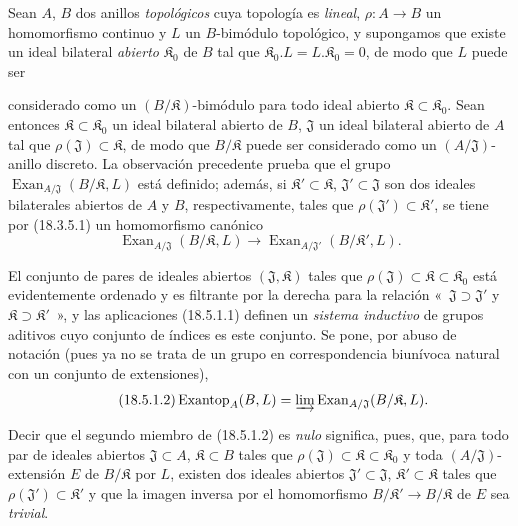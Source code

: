 \begin{env}[18.5.1]
\label{0.18.5.1-es}
Sean $A$, $B$ dos anillos \emph{topológicos} cuya topología es \emph{lineal},
$\rho:A\to B$ un homomorfismo continuo y $L$ un $B$-bimódulo topológico, y
supongamos que existe un ideal bilateral \emph{abierto} $\mathfrak K_0$ de $B$
tal que $\mathfrak K_0.L=L.\mathfrak K_0=0$, de modo que $L$ puede ser


considerado como un $(B/\mathfrak K)$-bimódulo para todo ideal abierto
$\mathfrak K\subset\mathfrak K_0$. Sean entonces
$\mathfrak K\subset\mathfrak K_0$ un ideal bilateral abierto de $B$,
$\mathfrak J$ un ideal bilateral abierto de $A$ tal que
$\rho(\mathfrak J)\subset\mathfrak K$, de modo que $B/\mathfrak K$ puede ser
considerado como un $(A/\mathfrak J)$-anillo discreto. La observación
precedente prueba que el grupo
$\operatorname{Exan}_{A/\mathfrak J}(B/\mathfrak K,L)$ está definido; además,
si $\mathfrak K'\subset\mathfrak K$, $\mathfrak J'\subset\mathfrak J$ son dos
ideales bilaterales abiertos de $A$ y $B$, respectivamente, tales que
$\rho(\mathfrak J')\subset\mathfrak K'$, se tiene por (18.3.5.1) un
homomorfismo canónico
\begin{equation}
\label{0.18.5.1.1-es}
\tag{18.5.1.1}
  \operatorname{Exan}_{A/\mathfrak J}(B/\mathfrak K,L)
  \longrightarrow
  \operatorname{Exan}_{A/\mathfrak J'}(B/\mathfrak K',L).
\end{equation}

El conjunto de pares de ideales abiertos $(\mathfrak J,\mathfrak K)$ tales que
$\rho(\mathfrak J)\subset\mathfrak K\subset\mathfrak K_0$ está evidentemente
ordenado y es filtrante por la derecha para la relación «~$\mathfrak J\supset\mathfrak J'$
y $\mathfrak K\supset\mathfrak K'$~», y las aplicaciones (18.5.1.1)
definen un \emph{sistema inductivo} de grupos aditivos cuyo conjunto
de índices es este conjunto. Se pone, por abuso de notación (pues ya no se trata
de un grupo en correspondencia biunívoca natural con un conjunto
de extensiones),
\begin{equation}
\label{0.18.5.1.2-es}
\tag{18.5.1.2}
  \operatorname{Exantop}_A(B,L)
  =\varinjlim\operatorname{Exan}_{A/\mathfrak J}(B/\mathfrak K,L).
\end{equation}

Decir que el segundo miembro de (18.5.1.2) es \emph{nulo} significa, pues, que, para
todo par de ideales abiertos $\mathfrak J\subset A$, $\mathfrak K\subset B$
tales que $\rho(\mathfrak J)\subset\mathfrak K\subset\mathfrak K_0$ y toda
$(A/\mathfrak J)$-extensión $E$ de $B/\mathfrak K$ por $L$, existen dos
ideales abiertos $\mathfrak J'\subset\mathfrak J$,
$\mathfrak K'\subset\mathfrak K$ tales que
$\rho(\mathfrak J')\subset\mathfrak K'$ y que la imagen inversa por
el homomorfismo $B/\mathfrak K'\to B/\mathfrak K$ de $E$ sea \emph{trivial}.


\end{env}
